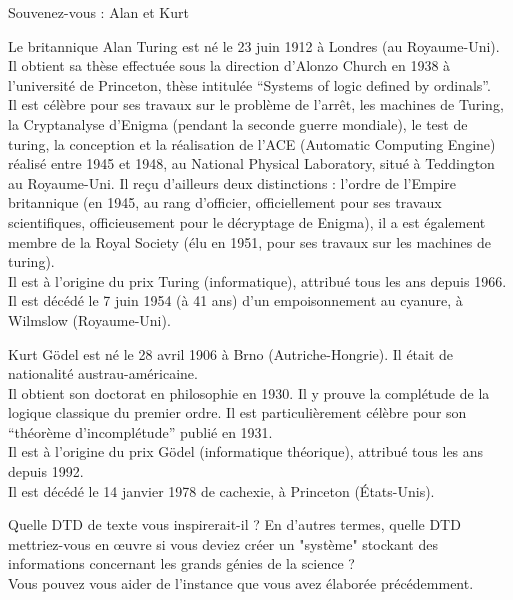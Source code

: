 \begin{frame}{Souvenez-vous : Alan et Kurt}
\begin{footnotesize}
Le britannique Alan Turing est n\'e le  23 juin 1912 \`a Londres (au Royaume-Uni). 
 Il obtient sa th\`ese effectu\'ee sous la direction d'Alonzo Church en 1938 \`a l'universit\'e de Princeton, th\`ese intitul\'ee ``Systems of logic defined by ordinals''. \\
 Il est c\'el\`ebre pour ses travaux sur le probl\`eme de l'arr\^et, les machines de Turing, la Cryptanalyse d'Enigma (pendant la seconde guerre mondiale), le test de turing, la conception et la r\'ealisation de l'ACE (Automatic Computing Engine) r\'ealis\'e entre 1945 et 1948, au National Physical Laboratory, situ\'e \`a Teddington au Royaume-Uni. Il re\c{c}u d'ailleurs deux distinctions : l'ordre de l'Empire britannique (en 1945, au rang d'officier, officiellement pour ses travaux scientifiques, officieusement pour le d\'ecryptage de Enigma), il a est \'egalement membre de la Royal Society (\'elu en 1951, pour ses travaux sur les machines de turing).\\
 Il est \`a l'origine du prix Turing (informatique), attribu\'e tous les ans depuis 1966.\\
 Il est d\'ec\'ed\'e le 7 juin 1954 (\`a 41 ans) d'un empoisonnement au cyanure, \`a Wilmslow (Royaume-Uni).

\smallskip

 Kurt G\"odel est n\'e le 28 avril 1906 \`a Brno (Autriche-Hongrie). Il \'etait de nationalit\'e austrau-am\'ericaine.\\
 Il obtient son doctorat en philosophie en 1930. Il y prouve la compl\'etude de la logique classique du premier ordre. Il est particuli\`erement c\'el\`ebre pour son ``th\'eor\`eme d'incompl\'etude'' publi\'e en 1931.\\
 Il est \`a l'origine du prix G\"odel (informatique th\'eorique), attribu\'e tous les ans depuis 1992.\\
 Il est d\'ec\'ed\'e le 14 janvier 1978 de cachexie, \`a Princeton (\'Etats-Unis).\\
\end{footnotesize}

\begin{exoblock}
Quelle DTD de texte vous inspirerait-il ? En d'autres termes, quelle DTD mettriez-vous en œuvre si vous deviez créer un "système" stockant des informations concernant les grands génies de la science ?\\
Vous pouvez vous aider de l'instance que vous avez élaborée précédemment.
\end{exoblock}
\end{frame}

